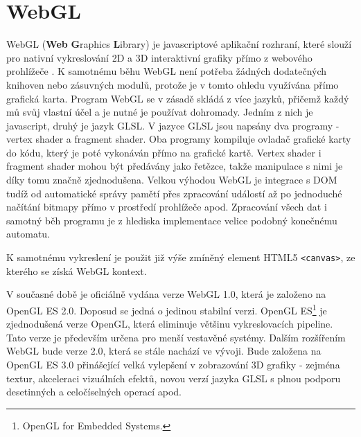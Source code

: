 \newpage

\section{WebGL}
WebGL (\textbf{Web} \textbf{G}raphics \textbf{L}ibrary) je javascriptové aplikační rozhraní, které slouží pro nativní vykreslování 2D a 3D interaktivní grafiky přímo z webového prohlížeče \cite{mozilla}. K samotnému běhu WebGL není potřeba žádných dodatečných knihoven nebo zásuvných modulů, protože je v tomto ohledu využívána přímo grafická karta. Program WebGL se v zásadě skládá z více jazyků, přičemž každý mů svůj vlastní účel a je nutné je používat dohromady. Jedním z nich je javascript, druhý je jazyk GLSL. V jazyce GLSL jsou napsány dva programy - vertex shader a fragment shader. Oba programy kompiluje ovladač grafické karty do kódu, který je poté vykonáván přímo na grafické kartě. Vertex shader i fragment shader mohou být předávány jako řetězce, takže manipulace s nimi je díky tomu značně zjednodušena. Velkou výhodou WebGL je integrace s DOM tudíž od automatické správy pamětí přes zpracování událostí až po jednoduché načítání bitmapy přímo v prostředí prohlížeče apod. Zpracování všech dat i samotný běh programu je z hlediska implementace velice podobný konečnému automatu. 

K samotnému vykreslení je použit již výše zmíněný element HTML5 \texttt{<canvas>}, ze kterého se získá WebGL kontext.

V současné době je oficiálně vydána verze WebGL 1.0, která je založeno na OpenGL ES 2.0. Doposud se jedná o jedinou stabilní verzi. OpenGL ES\footnote{OpenGL for Embedded Systems.} je zjednodušená verze OpenGL, která eliminuje většinu vykreslovacích pipeline. Tato verze je především určena pro menší vestavěné systémy. Dalším rozšířením WebGL bude verze 2.0, která se stále nachází ve vývoji. Bude založena na OpenGL ES 3.0 přinášející velká vylepšení v zobrazování 3D grafiky - zejména textur, akceleraci vizuálních efektů, novou verzí jazyka GLSL s plnou podporu desetinných a celočíselných operací apod.



